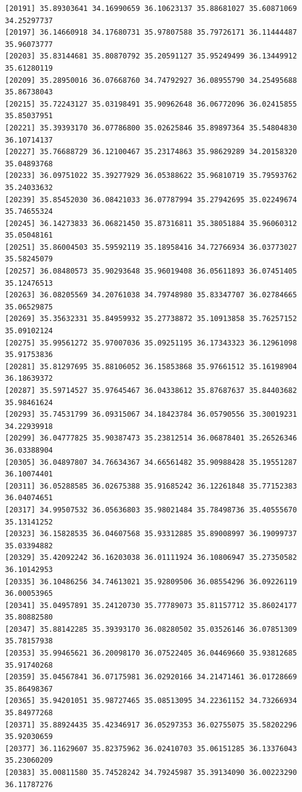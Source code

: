 \documentclass[
  letterpaper,
  DIV=11,
  numbers=noendperiod]{scrartcl}
\begin{document}
\begin{verbatim}
[20191] 35.89303641 34.16990659 36.10623137 35.88681027 35.60871069 34.25297737
[20197] 36.14660918 34.17680731 35.97807588 35.79726171 36.11444487 35.96073777
[20203] 35.83144681 35.80870792 35.20591127 35.95249499 36.13449912 35.61280119
[20209] 35.28950016 36.07668760 34.74792927 36.08955790 34.25495688 35.86738043
[20215] 35.72243127 35.03198491 35.90962648 36.06772096 36.02415855 35.85037951
[20221] 35.39393170 36.07786800 35.02625846 35.89897364 35.54804830 36.10714137
[20227] 35.76688729 36.12100467 35.23174863 35.98629289 34.20158320 35.04893768
[20233] 36.09751022 35.39277929 36.05388622 35.96810719 35.79593762 35.24033632
[20239] 35.85452030 36.08421033 36.07787994 35.27942695 35.02249674 35.74655324
[20245] 36.14273833 36.06821450 35.87316811 35.38051884 35.96060312 35.05048161
[20251] 35.86004503 35.59592119 35.18958416 34.72766934 36.03773027 35.58245079
[20257] 36.08480573 35.90293648 35.96019408 36.05611893 36.07451405 35.12476513
[20263] 36.08205569 34.20761038 34.79748980 35.83347707 36.02784665 35.06529875
[20269] 35.35632331 35.84959932 35.27738872 35.10913858 35.76257152 35.09102124
[20275] 35.99561272 35.97007036 35.09251195 36.17343323 36.12961098 35.91753836
[20281] 35.81297695 35.88106052 36.15853868 35.97661512 35.16198904 36.18639372
[20287] 35.59714527 35.97645467 36.04338612 35.87687637 35.84403682 35.98461624
[20293] 35.74531799 36.09315067 34.18423784 36.05790556 35.30019231 34.22939918
[20299] 36.04777825 35.90387473 35.23812514 36.06878401 35.26526346 36.03388904
[20305] 36.04897807 34.76634367 34.66561482 35.90988428 35.19551287 36.10074401
[20311] 36.05288585 36.02675388 35.91685242 36.12261848 35.77152383 36.04074651
[20317] 34.99507532 36.05636803 35.98021484 35.78498736 35.40555670 35.13141252
[20323] 36.15828535 36.04607568 35.93312885 35.89008997 36.19099737 35.03394882
[20329] 35.42092242 36.16203038 36.01111924 36.10806947 35.27350582 36.10142953
[20335] 36.10486256 34.74613021 35.92809506 36.08554296 36.09226119 36.00053965
[20341] 35.04957891 35.24120730 35.77789073 35.81157712 35.86024177 35.80882580
[20347] 35.88142285 35.39393170 36.08280502 35.03526146 36.07851309 35.78157938
[20353] 35.99465621 36.20098170 36.07522405 36.04469660 35.93812685 35.91740268
[20359] 35.04567841 36.07175981 36.02920166 34.21471461 36.01728669 35.86498367
[20365] 35.94201051 35.98727465 35.08513095 34.22361152 34.73266934 35.84977268
[20371] 35.88924435 35.42346917 36.05297353 36.02755075 35.58202296 35.92030659
[20377] 36.11629607 35.82375962 36.02410703 35.06151285 36.13376043 35.23060209
[20383] 35.00811580 35.74528242 34.79245987 35.39134090 36.00223290 36.11787276

\end{verbatim}
\end{document}
